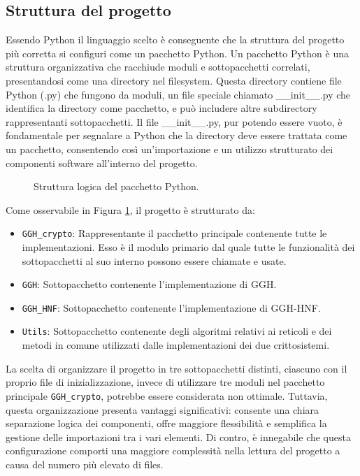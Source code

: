\subsection{Struttura del progetto}
\label{sec:struttura}
Essendo Python il linguaggio scelto è conseguente che la struttura del progetto più corretta
si configuri come un pacchetto Python. Un pacchetto Python è una struttura organizzativa che 
racchiude moduli e sottopacchetti correlati, presentandosi come una directory nel filesystem.
Questa directory contiene file Python (.py) che fungono da moduli, un file speciale chiamato 
\_\_init\_\_.py che identifica la directory come pacchetto, e può includere altre subdirectory 
rappresentanti sottopacchetti. 
Il file \_\_init\_\_.py, pur potendo essere vuoto, è fondamentale per segnalare a Python che la 
directory deve essere trattata come un pacchetto, consentendo così un'importazione e un 
utilizzo strutturato dei componenti software all'interno del progetto.\\

\begin{figure}[h]
    \centering
    \begin{minipage}{7cm}
    \end{minipage}
    \caption{Struttura logica del pacchetto Python.}
    \label{fig:pythonpackage}
\end{figure}

Come osservabile in Figura \ref{fig:pythonpackage}, il progetto è strutturato da:
\begin{itemize}
    \item \texttt{GGH\_crypto}: Rappresentante il pacchetto principale contenente tutte le implementazioni. 
    Esso è il modulo primario dal quale tutte le funzionalità dei
    sottopacchetti al suo interno possono essere chiamate e usate. 
    \item \texttt{GGH}: Sottopacchetto contenente l'implementazione di GGH.
    \item \texttt{GGH\_HNF}: Sottopacchetto contenente l'implementazione di GGH-HNF.
    \item \texttt{Utils}: Sottopacchetto contenente degli algoritmi relativi ai reticoli e 
    dei metodi in comune utilizzati dalle implementazioni dei due crittosistemi. 
\end{itemize}

La scelta di organizzare il progetto in tre sottopacchetti distinti, ciascuno con il proprio 
file di inizializzazione, invece di utilizzare tre moduli nel pacchetto principale \texttt{GGH\_crypto}, 
potrebbe essere considerata non ottimale. 
Tuttavia, questa organizzazione presenta vantaggi significativi: consente una chiara 
separazione logica dei componenti, offre maggiore flessibilità e semplifica la 
gestione delle importazioni tra i vari elementi. Di contro, è innegabile che 
questa configurazione comporti una maggiore complessità nella lettura del progetto 
a causa del numero più elevato di files.